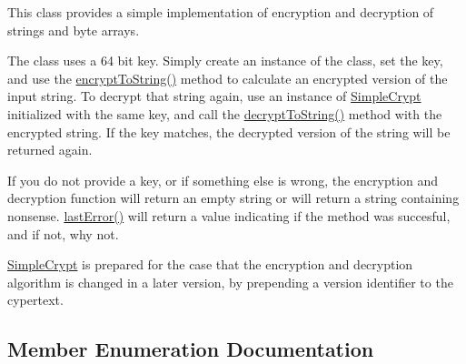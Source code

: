 This class provides a simple implementation of encryption and decryption of strings and byte arrays.

The class uses a 64 bit key. Simply create an instance of the class, set the key, and use the \hyperlink{class_simple_crypt_af26a3d3c6cef9732190c1d2c6a53a5b5}{encrypt\+To\+String()} method to calculate an encrypted version of the input string. To decrypt that string again, use an instance of \hyperlink{class_simple_crypt}{Simple\+Crypt} initialized with the same key, and call the \hyperlink{class_simple_crypt_aa454cf372b534fd5ffaa2c5bd0fa57ea}{decrypt\+To\+String()} method with the encrypted string. If the key matches, the decrypted version of the string will be returned again.

If you do not provide a key, or if something else is wrong, the encryption and decryption function will return an empty string or will return a string containing nonsense. \hyperlink{class_simple_crypt_a123562e29377ab26e3b398b588f596d9}{last\+Error()} will return a value indicating if the method was succesful, and if not, why not.

\hyperlink{class_simple_crypt}{Simple\+Crypt} is prepared for the case that the encryption and decryption algorithm is changed in a later version, by prepending a version identifier to the cypertext. 

\subsection{Member Enumeration Documentation}
\hypertarget{class_simple_crypt_a25298e746f175cf175a18f082092ca8e}{}
